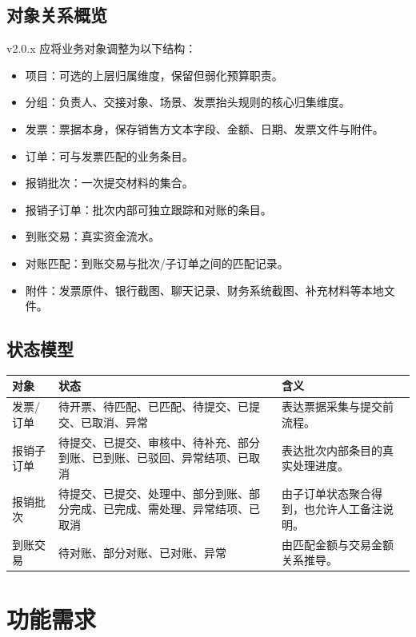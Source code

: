 \documentclass[UTF8,zihao=-4]{ctexart}
\begin{document}
\subsection{对象关系概览}

v2.0.x 应将业务对象调整为以下结构：

\begin{itemize}
  \item 项目：可选的上层归属维度，保留但弱化预算职责。
  \item 分组：负责人、交接对象、场景、发票抬头规则的核心归集维度。
  \item 发票：票据本身，保存销售方文本字段、金额、日期、发票文件与附件。
  \item 订单：可与发票匹配的业务条目。
  \item 报销批次：一次提交材料的集合。
  \item 报销子订单：批次内部可独立跟踪和对账的条目。
  \item 到账交易：真实资金流水。
  \item 对账匹配：到账交易与批次/子订单之间的匹配记录。
  \item 附件：发票原件、银行截图、聊天记录、财务系统截图、补充材料等本地文件。
\end{itemize}

\subsection{状态模型}

\begin{longtable}{p{3.2cm}p{4.2cm}p{7.0cm}}
\toprule
对象 & 状态 & 含义 \\
\midrule
发票/订单 & 待开票、待匹配、已匹配、待提交、已提交、已取消、异常 & 表达票据采集与提交前流程。 \\
报销子订单 & 待提交、已提交、审核中、待补充、部分到账、已到账、已驳回、异常结项、已取消 & 表达批次内部条目的真实处理进度。 \\
报销批次 & 待提交、已提交、处理中、部分到账、部分完成、已完成、需处理、异常结项、已取消 & 由子订单状态聚合得到，也允许人工备注说明。 \\
到账交易 & 待对账、部分对账、已对账、异常 & 由匹配金额与交易金额关系推导。 \\
\bottomrule
\end{longtable}

\section{功能需求}
\end{document}
